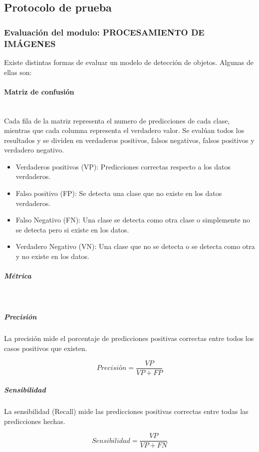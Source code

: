 \subsection{Protocolo de prueba}

\subsubsection{Evaluación del modulo: PROCESAMIENTO DE IMÁGENES}

Existe distintas formas de evaluar un modelo de detección de objetos. Algunas de ellas son: 

\paragraph{Matriz de confusión}\mbox{}\\

Cada fila de la matriz representa el numero de predicciones de cada clase, mientras que cada columna representa el verdadero valor. Se evalúan todos los resultados y se dividen en verdaderos positivos, falsos negativos, falsos positivos y verdadero negativo.\par
\bigbreak

\bigbreak
\begin{itemize}
    \item Verdaderos positivos (VP): Predicciones correctas respecto a los datos verdaderos.
    \item Falso positivo (FP): Se detecta una clase que no existe en los datos verdaderos.
    \item Falso Negativo (FN): Una clase se detecta como otra clase o simplemente no se detecta pero si existe en los datos.
    \item Verdadero Negativo (VN): Una clase que no se detecta o se detecta como otra y no existe en los datos. 
\end{itemize}
\bigbreak

\subparagraph{Métrica}\mbox{}\\

\subparagraph{Precisión}
La precisión mide el porcentaje de predicciones positivas correctas entre todos los casos positivos que existen.

\[Precisión = \frac{VP}{VP+FP}\]

\subparagraph{Sensibilidad}
La sensibilidad (Recall) mide las predicciones positivas correctas entre todas las predicciones hechas.

\[Sensibilidad = \frac{VP}{VP+FN}\]

